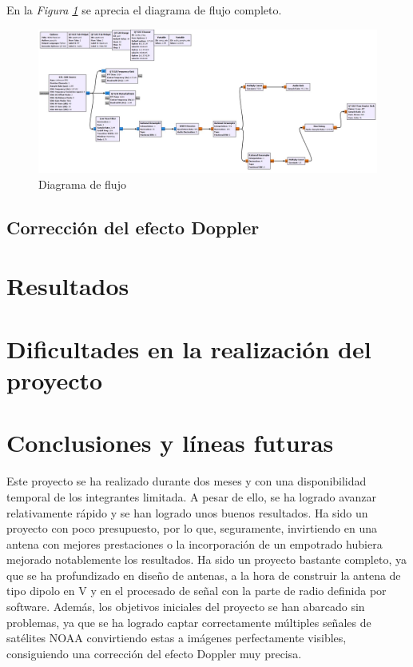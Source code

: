 \documentclass[a4paper,openright,12pt]{article}
\begin{document}
	 En la \textit{Figura \ref{diagrama_completo}} se aprecia el diagrama de flujo completo.
	
	\begin{figure}[hbtp]
 \centering
 \includegraphics[width = 17cm]{imagenes/diagrama_flujo_completo.JPG}
 \caption{Diagrama de flujo}
 \label{diagrama_completo}
 \end{figure}




	\subsection{Corrección del efecto Doppler}

\section{Resultados}

\section{Dificultades en la realización del proyecto}

\newpage
\section{Conclusiones y líneas futuras}

Este proyecto se ha realizado durante dos meses y con una disponibilidad temporal de los integrantes limitada. A pesar de ello, se ha logrado avanzar relativamente rápido y se han logrado unos buenos resultados. Ha sido un proyecto con poco presupuesto, por lo que, seguramente, invirtiendo en una antena con mejores prestaciones o la incorporación de un empotrado hubiera mejorado notablemente los resultados.
Ha sido un proyecto bastante completo, ya que se ha profundizado en diseño de antenas, a la hora de construir la antena de tipo dipolo en V y en el procesado de señal con la parte de radio definida por software. Además, los objetivos iniciales del proyecto se han abarcado sin problemas, ya que se ha logrado captar correctamente múltiples señales de satélites NOAA convirtiendo estas a imágenes perfectamente visibles, consiguiendo una corrección del efecto Doppler muy precisa.
\end{document}
